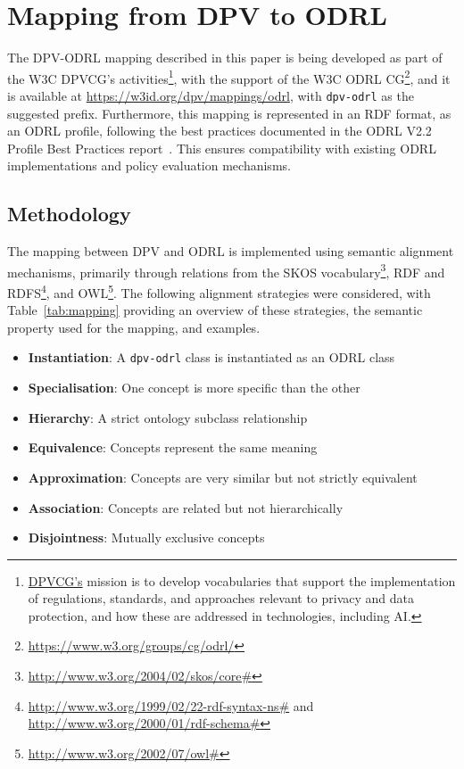 \section{Mapping from DPV to ODRL}
\label{sec:mapping}

The DPV-ODRL mapping described in this paper
is being developed as part of the W3C DPVCG's activities\footnote{
    \href{https://www.w3.org/groups/cg/dpvcg/}{DPVCG's} mission is to develop vocabularies
    that support the implementation of regulations,
    standards, and approaches relevant to privacy and data protection,
    and how these are addressed in technologies, including AI.},
with the support of the W3C ODRL CG\footnote{
    \url{https://www.w3.org/groups/cg/odrl/}},
and it is available at \url{https://w3id.org/dpv/mappings/odrl},
with \texttt{dpv-odrl} as the suggested prefix.
Furthermore,
this mapping is represented in an RDF format,
as an ODRL profile,
following the best practices documented in the
ODRL V2.2 Profile Best Practices report~\cite{steidl_odrl_2023}. 
This ensures compatibility with existing ODRL implementations
and policy evaluation mechanisms.

\subsection{Methodology}
\label{sec:methodology}

The mapping between DPV and ODRL is implemented
using semantic alignment mechanisms,
primarily through relations from the SKOS vocabulary\footnote{
    \url{http://www.w3.org/2004/02/skos/core\#}},
RDF and RDFS\footnote{
    \url{http://www.w3.org/1999/02/22-rdf-syntax-ns\#} and
    \url{http://www.w3.org/2000/01/rdf-schema\#}}, and
OWL\footnote{
    \url{http://www.w3.org/2002/07/owl\#}}.
The following alignment strategies were considered, with
Table~\ref{tab:mapping} providing an overview of these strategies,
the semantic property used for the mapping,
and examples.
\begin{itemize}
    \item \textbf{Instantiation}: A \texttt{dpv-odrl} class is instantiated as an ODRL class
    \item \textbf{Specialisation}: One concept is more specific than the other
    \item \textbf{Hierarchy}: A strict ontology subclass relationship
    \item \textbf{Equivalence}: Concepts represent the same meaning
    \item \textbf{Approximation}: Concepts are very similar but not strictly equivalent
    \item \textbf{Association}: Concepts are related but not hierarchically
    \item \textbf{Disjointness}: Mutually exclusive concepts
\end{itemize}

